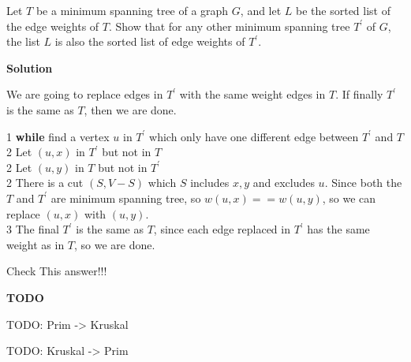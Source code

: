 Let $T$ be a minimum spanning tree of a graph $G$, and let $L$ be the sorted
list of the edge weights of $T$. Show that for any other minimum spanning tree
$T^{'}$ of $G$, the list $L$ is also the sorted list of edge weights of $T^{'}$.

\textbf{Solution}

We are going to replace edges in $T^{'}$ with the same weight edges in $T$. If
finally $T^{'}$ is the same as $T$, then we are done.

1 \space \textbf{while} find a vertex $u$ in $T^{'}$ which only have one different
edge between $T^{'}$ and $T$ \\
2 \space \space Let $(u, x)$ in $T^{'}$ but not in $T$ \\
2 \space \space Let $(u, y)$ in $T$ but not in $T^{'}$ \\
2 \space \space There is a cut $(S, V - S)$ which $S$ includes $x, y$ and
excludes $u$. Since both the $T$ and $T^{'}$ are minimum spanning tree, so
$w(u, x) == w(u, y)$, so we can replace $(u, x)$ with $(u, y)$.\\
3 \space The final $T^{'}$ is the same as $T$, since each edge replaced in $T^{'}$
has the same weight as in $T$, so we are done.

Check This answer!!!



\textbf{TODO}

TODO: Prim -> Kruskal

TODO: Kruskal -> Prim
